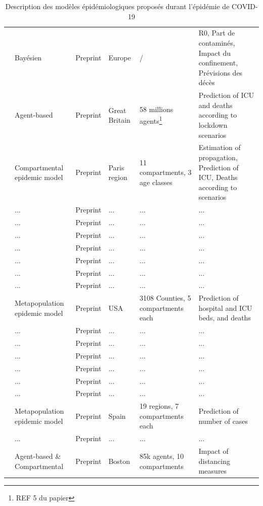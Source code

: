 \documentclass[review]{elsarticle}
\begin{document}
\begin{table}
\begin{adjustbox}{center}
{\begin{tabular}{p{4cm}|p{2cm}|p{2cm}|p{2cm}|p{2cm}|p{11cm}}
  \citet{flaxman_report_2020} & Bayésien & Preprint & Europe & / & R0, Part de contaminés, Impact du confinement, Prévisions des décès \\
  \citet{ferguson_report_2020} & Agent-based & Preprint & Great Britain & 58 millions agents\footnote{REF 5 du papier} & Prediction of ICU and deaths according to lockdown scenarios  \\
  \citet{di_domenico_expected_2020} & Compartmental epidemic model & Preprint & Paris region & 11 compartments, 3 age classes & Estimation of propagation, Prediction of ICU, Deaths according to scenarios \\
  \citet{wilder_role_2020} & ... & Preprint & ... &... &...  \\
  \citet{simha_simple_2020} & ... & Preprint & ... &... &...  \\
  \citet{roux_covid-19_2020} & ... & Preprint & ... &... &...  \\
  \citet{pullano_population_2020} & ... & Preprint & ... &... &...  \\
  \citet{salje_estimating_2020} & ... & Preprint & ... &... &...  \\
  \citet{team_forecasting_2020} & ... & Preprint & ... &... &...  \\
  \citet{luo_predictive_2020} & ... & Preprint & ... &... &...  \\
  \citet{branas_flattening_2020} & Metapopulation epidemic model & Preprint & USA & 3108 Counties, 5 compartments each & Prediction of hospital and ICU beds, and deaths  \\
  \citet{keskinocak_impact_2020} & ... & Preprint & ... &... &...  \\
  \citet{wang_spatiotemporal_2020} & ... & Preprint & ... &... &...  \\
  \citet{li_overview_2020} & ... & Preprint & ... &... &...  \\
  \citet{woody_projections_2020} & ... & Preprint & ... &... &...  \\
  \citet{pei_initial_2020} & ... & Preprint & ... &... &...  \\
  \citet{platen_stochastic_2020} & ... & Preprint & ... &... &...  \\
  \citet{arenas_mathematical_2020} & Metapopulation epidemic model & Preprint & Spain & 19 regions, 7 compartments each & Prediction of number of cases  \\
  \citet{sanche_high_2020} & ... & Preprint & ... & ... & ...  \\
  \citet{aleta_modeling_2020} & Agent-based \& Compartmental & Preprint & Boston & 85k agents, 10 compartments & Impact of distancing measures  \\

\end{tabular}}
\end{adjustbox}
\caption{Description des modèles épidémiologiques proposés durant l'épidémie de COVID-19}
\label{table:1}
\end{table}
\end{document}
